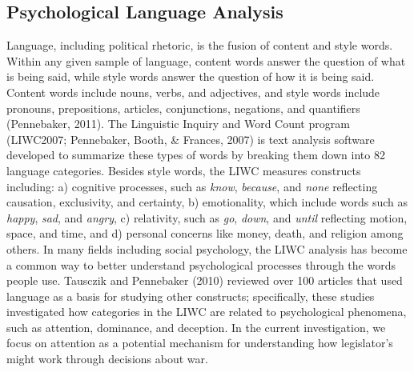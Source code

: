 \documentclass[english,man]{apa6}
\theoremstyle{definition}
\theoremstyle{definition}
\theoremstyle{definition}
\theoremstyle{remark}
\begin{document}
\subsection{Psychological Language
Analysis}\label{psychological-language-analysis}

Language, including political rhetoric, is the fusion of content and
style words. Within any given sample of language, content words answer
the question of what is being said, while style words answer the
question of how it is being said. Content words include nouns, verbs,
and adjectives, and style words include pronouns, prepositions,
articles, conjunctions, negations, and quantifiers (Pennebaker, 2011).
The Linguistic Inquiry and Word Count program (LIWC2007; Pennebaker,
Booth, \& Frances, 2007) is text analysis software developed to
summarize these types of words by breaking them down into 82 language
categories. Besides style words, the LIWC measures constructs including:
a) cognitive processes, such as \emph{know}, \emph{because}, and
\emph{none} reflecting causation, exclusivity, and certainty, b)
emotionality, which include words such as \emph{happy}, \emph{sad}, and
\emph{angry}, c) relativity, such as \emph{go}, \emph{down}, and
\emph{until} reflecting motion, space, and time, and d) personal
concerns like money, death, and religion among others. In many fields
including social psychology, the LIWC analysis has become a common way
to better understand psychological processes through the words people
use. Tausczik and Pennebaker (2010) reviewed over 100 articles that used
language as a basis for studying other constructs; specifically, these
studies investigated how categories in the LIWC are related to
psychological phenomena, such as attention, dominance, and deception. In
the current investigation, we focus on attention as a potential
mechanism for understanding how legislator's might work through
decisions about war.
\end{document}
